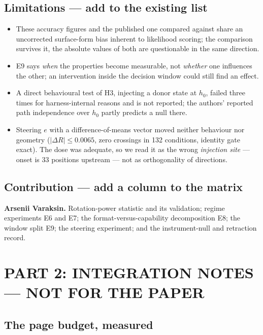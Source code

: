 \documentclass[11pt,a4paper]{article}
\begin{document}
\subsection*{Limitations --- add to the existing list}

\begin{itemize}\itemsep1pt
  \item These accuracy figures and the published one compared against share an uncorrected
        surface-form bias inherent to likelihood scoring; the comparison survives it, the absolute
        values of both are questionable in the same direction.
  \item E9 says \emph{when} the properties become measurable, not \emph{whether} one influences
        the other; an intervention inside the decision window could still find an effect.
  \item A direct behavioural test of H3, injecting a donor state at $h_0$, failed three times for
        harness-internal reasons and is not reported; the authors' reported path independence over
        $h_0$ partly predicts a null there.
  \item Steering $e$ with a difference-of-means vector moved neither behaviour nor geometry
        ($|\Delta R| \le 0.0065$, zero crossings in 132 conditions, identity gate exact). The dose
        was adequate, so we read it as the wrong \emph{injection site} --- onset is 33 positions
        upstream --- not as orthogonality of directions.
\end{itemize}

\subsection*{Contribution --- add a column to the matrix}

\textbf{Arsenii Varaksin.} Rotation-power statistic and its validation; regime experiments E6
and E7; the format-versus-capability decomposition E8; the window split E9; the steering
experiment; and the instrument-null and retraction record.

\clearpage
\section*{PART 2: INTEGRATION NOTES --- NOT FOR THE PAPER}
\label{sec:notes}

\subsection*{The page budget, measured}
\end{document}
